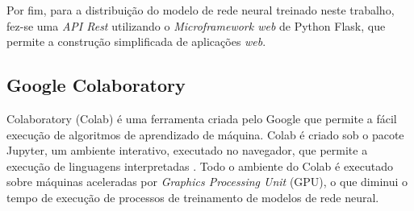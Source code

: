 \par Por fim, para a distribuição do modelo de rede neural treinado neste trabalho, fez-se uma \textit{API Rest} utilizando o \textit{Microframework web} de Python Flask, que permite a construção simplificada de aplicações \textit{web}.

\subsection{Google Colaboratory}

\par Colaboratory (Colab) é uma ferramenta criada pelo Google que permite a fácil execução de algoritmos de aprendizado de máquina. Colab é criado sob o pacote Jupyter, um ambiente interativo, executado no navegador, que permite a execução de linguagens interpretadas \cite{PER-GRA:2007}. Todo o ambiente do Colab é executado sobre máquinas aceleradas por \textit{Graphics Processing Unit} (GPU), o que diminui o tempo de execução de processos de treinamento de modelos de rede neural.
